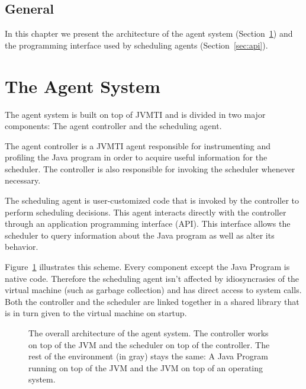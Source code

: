 \subsection{General}


\iffalse
In this chapter we present the architecture of the agent system (Section~\ref{sec:agentsystem}) and the programming interface used by scheduling agents (Section~\ref{sec:api}).

\section{The Agent System} \label{sec:agentsystem}

The agent system is built on top of JVMTI and is divided in two major components: The agent controller and the scheduling agent.

The agent controller is a JVMTI agent responsible for instrumenting and profiling the Java program in order to acquire useful information for the scheduler. The controller is also responsible for invoking the scheduler whenever necessary.

The scheduling agent is user-customized code that is invoked by the controller to perform scheduling decisions. This agent interacts directly with the controller through an application programming interface (API). This interface allows the scheduler to query information about the Java program as well as alter its behavior.

Figure~\ref{fig:agentsystem} illustrates this scheme. Every component except the Java Program is native code. Therefore the scheduling agent isn't affected by idiosyncrasies of the virtual machine (such as garbage collection) and has direct access to system calls. Both the controller and the scheduler are linked together in a shared library that is in turn given to the virtual machine on startup.

\begin{figure} \label{fig:agentsystem}
\centering
{}
\caption{The overall architecture of the agent system. The controller works on top of the JVM and the scheduler on top of the controller. The rest of the environment (in gray) stays the same: A Java Program running on top of the JVM and the JVM on top of an operating system.}
\end{figure}

